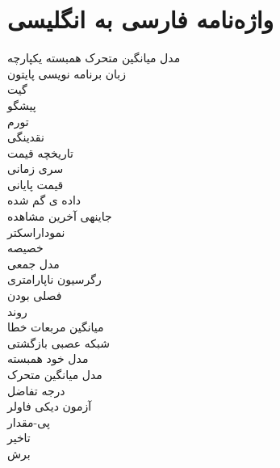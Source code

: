 \documentclass[12pt]{report}
\begin{document}
\chapter*{واژه‌نامه فارسی به انگلیسی}
مدل میانگین متحرک همبسته یکپارچه
\dotfill {} \\
زبان برنامه نویسی پایتون
\dotfill {} \\
گیت
\dotfill {} \\
پیشگو
\dotfill {} \\
تورم
\dotfill {} \\
نقدینگی
\dotfill {} \\
تاریخچه قیمت
\dotfill {} \\
سری زمانی
\dotfill {} \\
قیمت پایانی
\dotfill {} \\
داده ی گم شده
\dotfill {} \\
جاینهی آخرین مشاهده
\dotfill {} \\
نموداراسکتر
\dotfill {} \\
خصیصه
\dotfill {} \\
مدل جمعی
\dotfill {} \\
رگرسیون ناپارامتری
\dotfill {} \\
فصلی بودن
\dotfill {} \\
روند
\dotfill {} \\
میانگین مربعات خطا
\dotfill {} \\
شبکه عصبی بازگشتی
\dotfill {} \\
مدل خود همبسته
\dotfill {} \\
مدل میانگین متحرک
\dotfill {} \\
درجه تفاضل
\dotfill {} \\
آزمون دیکی فاولر
\dotfill {} \\
پی-مقدار
\dotfill {} \\
تاخیر
\dotfill {} \\
برش
\dotfill {} \\
\end{document}
